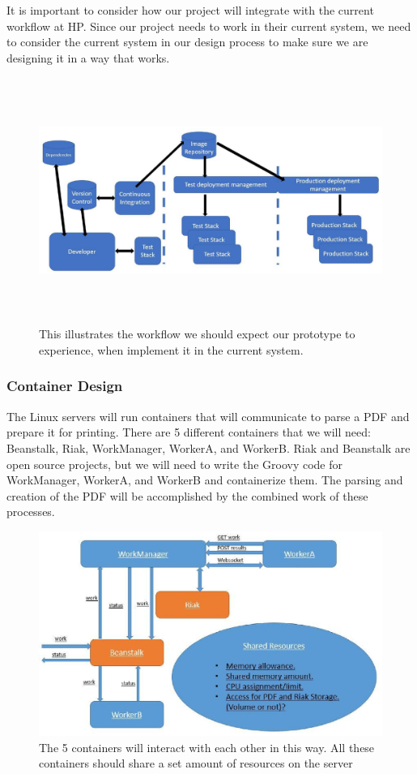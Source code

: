 \documentclass[onecolumn, draftclsnofoot,10pt, compsoc]{IEEEtran}
\begin{document}
It is important to consider how our project will integrate with the current workflow at HP.
Since our project needs to work in their current system, we need to consider the current system in our design process to make sure we are designing it in a way that works.

\begin{figure}[h]
    \centering
    \includegraphics[width=\textwidth, height=8cm]{prjct_arch}
    \caption{This illustrates the workflow we should expect our prototype to experience, when implement it in the current system.}
\end{figure}

\subsubsection{Container Design}

The Linux servers will run containers that will communicate to parse a PDF and prepare it for printing.
There are 5 different containers that we will need: Beanstalk, Riak, WorkManager, WorkerA, and WorkerB.
Riak and Beanstalk are open source projects, but we will need to write the Groovy code for WorkManager, WorkerA, and WorkerB and containerize them.
The parsing and creation of the PDF will be accomplished by the combined work of these processes. 
\newpage

\begin{figure}[h]
    \centering
    \includegraphics{prjct_arch_workers}
    \caption{The 5 containers will interact with each other in this way. All these containers should share a set amount of resources on the server}
\end{figure}
\end{document}
